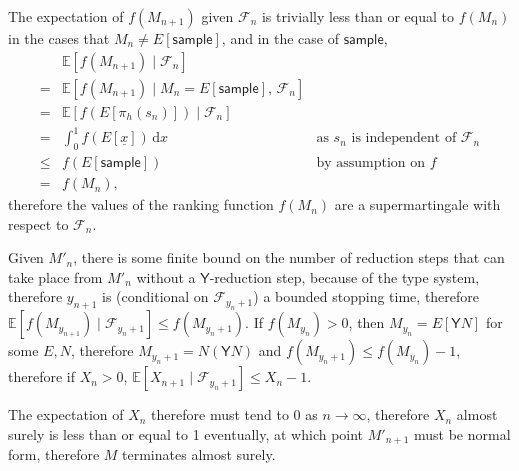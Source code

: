 \documentclass{article}
\newcommand{\Y}{\textsf{Y}}
\newcommand{\sample}{\textsf{sample}}
\begin{document}
The expectation of $f(M_{n+1})$ given $\mathcal{F}_n$ is trivially less than or equal to $f(M_n)$ in the cases that $M_n \neq E[\sample]$, and in the case of $\sample$,
\begin{align*}
& \mathbb{E}[f(M_{n+1}) \mid \mathcal{F}_n] \\
= & \mathbb{E}[f(M_{n+1}) \mid M_n = E[\sample],\, \mathcal{F}_n] \\
= & \mathbb{E}[f(E[\pi_h(s_n)]) \mid \mathcal{F}_n] \\
= & \int_0^1 f(E[\underline x]) \, \mathrm{d} x \qquad & \text{as }s_n\text{ is independent of } \mathcal{F}_n \\
\leq & f(E[\sample]) \qquad & \text{by assumption on } f \\
= & f(M_n),
\end{align*}
therefore the values of the ranking function $f(M_n)$ are a supermartingale with respect to $\mathcal{F}_n$.

Given $M'_n$, there is some finite bound on the number of reduction steps that can take place from $M'_n$ without a $\Y$-reduction step, because of the type system, therefore $y_{n+1}$ is (conditional on $\mathcal{F}_{y_n+1}$) a bounded stopping time, therefore $\mathbb{E}[f(M_{y_{n+1}}) \mid \mathcal{F}_{y_n+1}] \leq f(M_{y_n+1})$. If $f(M_{y_n}) > 0$, then $M_{y_n} = E[\Y N]$ for some $E, N$, therefore $M_{y_n+1} = N (\Y N)$ and $f(M_{y_n+1}) \leq f(M_{y_n}) - 1$, therefore if $X_n > 0$, $\mathbb{E}[X_{n+1} \mid \mathcal{F}_{y_n+1}] \leq X_n - 1$.

The expectation of $X_n$ therefore must tend to 0 as $n \to \infty$, therefore $X_n$ almost surely is less than or equal to 1 eventually, at which point $M'_{n+1}$ must be normal form, therefore $M$ terminates almost surely.








\iffalse
\begin{thebibliography}{9}
\bibitem{ppcf} Thomas Ehrhard, Michele Pagani, and Christine Tasson. Measurable cones and stable, measurable functions: a model for probabilistic higher-order programming. \emph{PACMPL}, 2(POPL):59:1–59:28, 2018. doi: 10.1145/3158147. URL \href{https://doi.org/10.1145/3158147}{https://doi.org/10.1145/3158147}.
\end{thebibliography}
\fi
\end{document}
